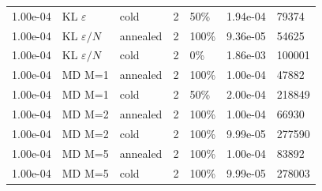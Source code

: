 \begin{table}
\begin{tabular}{lllrlll}
1.00e-04 & KL $\varepsilon$ & cold & 2 & 50\% & 1.94e-04 & 79374 \\
1.00e-04 & KL $\varepsilon/N$ & annealed & 2 & 100\% & 9.36e-05 & 54625 \\
1.00e-04 & KL $\varepsilon/N$ & cold & 2 & 0\% & 1.86e-03 & 100001 \\
1.00e-04 & MD M=1 & annealed & 2 & 100\% & 1.00e-04 & 47882 \\
1.00e-04 & MD M=1 & cold & 2 & 50\% & 2.00e-04 & 218849 \\
1.00e-04 & MD M=2 & annealed & 2 & 100\% & 1.00e-04 & 66930 \\
1.00e-04 & MD M=2 & cold & 2 & 100\% & 9.99e-05 & 277590 \\
1.00e-04 & MD M=5 & annealed & 2 & 100\% & 1.00e-04 & 83892 \\
1.00e-04 & MD M=5 & cold & 2 & 100\% & 9.99e-05 & 278003 \\
\bottomrule
\end{tabular}
\end{table}

